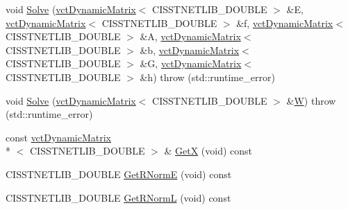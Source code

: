 \begin{DoxyCompactItemize}
\item 
void \hyperlink{classnmr_l_s_e_i_solver_a8e79cde23418891a18508fc3e9db876f}{Solve} (\hyperlink{classvct_dynamic_matrix}{vct\-Dynamic\-Matrix}$<$ C\-I\-S\-S\-T\-N\-E\-T\-L\-I\-B\-\_\-\-D\-O\-U\-B\-L\-E $>$ \&E, \hyperlink{classvct_dynamic_matrix}{vct\-Dynamic\-Matrix}$<$ C\-I\-S\-S\-T\-N\-E\-T\-L\-I\-B\-\_\-\-D\-O\-U\-B\-L\-E $>$ \&f, \hyperlink{classvct_dynamic_matrix}{vct\-Dynamic\-Matrix}$<$ C\-I\-S\-S\-T\-N\-E\-T\-L\-I\-B\-\_\-\-D\-O\-U\-B\-L\-E $>$ \&A, \hyperlink{classvct_dynamic_matrix}{vct\-Dynamic\-Matrix}$<$ C\-I\-S\-S\-T\-N\-E\-T\-L\-I\-B\-\_\-\-D\-O\-U\-B\-L\-E $>$ \&b, \hyperlink{classvct_dynamic_matrix}{vct\-Dynamic\-Matrix}$<$ C\-I\-S\-S\-T\-N\-E\-T\-L\-I\-B\-\_\-\-D\-O\-U\-B\-L\-E $>$ \&G, \hyperlink{classvct_dynamic_matrix}{vct\-Dynamic\-Matrix}$<$ C\-I\-S\-S\-T\-N\-E\-T\-L\-I\-B\-\_\-\-D\-O\-U\-B\-L\-E $>$ \&h)  throw (std\-::runtime\-\_\-error)
\item 
void \hyperlink{classnmr_l_s_e_i_solver_afaef5a6ce13d66c3744d344c9c0702db}{Solve} (\hyperlink{classvct_dynamic_matrix}{vct\-Dynamic\-Matrix}$<$ C\-I\-S\-S\-T\-N\-E\-T\-L\-I\-B\-\_\-\-D\-O\-U\-B\-L\-E $>$ \&\hyperlink{classnmr_l_s_e_i_solver_ab4e958a8679e59284ab62db215533c67}{W})  throw (std\-::runtime\-\_\-error)
\item 
const \hyperlink{classvct_dynamic_matrix}{vct\-Dynamic\-Matrix}\\*
$<$ C\-I\-S\-S\-T\-N\-E\-T\-L\-I\-B\-\_\-\-D\-O\-U\-B\-L\-E $>$ \& \hyperlink{classnmr_l_s_e_i_solver_a28143d347b93ead0708dcb7a1badda88}{Get\-X} (void) const 
\item 
C\-I\-S\-S\-T\-N\-E\-T\-L\-I\-B\-\_\-\-D\-O\-U\-B\-L\-E \hyperlink{classnmr_l_s_e_i_solver_af8d87848c598a766ca61cb0017621a5f}{Get\-R\-Norm\-E} (void) const 
\item 
C\-I\-S\-S\-T\-N\-E\-T\-L\-I\-B\-\_\-\-D\-O\-U\-B\-L\-E \hyperlink{classnmr_l_s_e_i_solver_a1622b27f3022ad3b2a1724140d0272af}{Get\-R\-Norm\-L} (void) const 
\end{DoxyCompactItemize}
